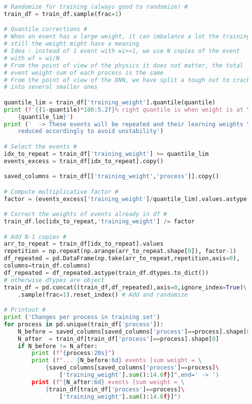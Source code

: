 \begin{lstlisting}[language=Python, caption=DNN setup for the \wwgg semi-leptonic final state, label={dnncode}]
# Randomize for training (always good to randomize) #
train_df = train_df.sample(frac=1)

# Quantile corrections #
# When an event has a large weight, it can imbalance a lot the training,
# still the weight might have a meaning
# Idea : instead of 1 event with wi>>1, we use N copies of the event
# with wf = wi/N
# From the point of view of the physics it does not matter, the total
# event weight sum of each process is the same
# From the point of view of the DNN, we have split a tough nut to crack
# into several smaller ones

quantile_lim = train_df['training_weight'].quantile(quantile)
print (f'{(1-quantile)*100:5.2f}% right quantile is when weight is at \
    {quantile_lim}')
print ('  -> These events will be repeated and their learning weights \
    reduced accordingly to avoid unstability') 

# Select the events #
idx_to_repeat = train_df['training_weight'] >= quantile_lim                          
events_excess = train_df[idx_to_repeat].copy()

saved_columns = train_df[['training_weight','process']].copy()

# Compute multiplicative factor #
factor = (events_excess['training_weight']/quantile_lim).values.astype(np.int32) 

# Correct the weights of events already in df #
train_df.loc[idx_to_repeat,'training_weight'] /= factor

# Add N-1 copies #
arr_to_repeat = train_df[idx_to_repeat].values                                       
repetition = np.repeat(np.arange(arr_to_repeat.shape[0]), factor-1)                   
df_repeated = pd.DataFrame(np.take(arr_to_repeat,repetition,axis=0),
columns=train_df.columns)
df_repeated = df_repeated.astype(train_df.dtypes.to_dict()) 
# otherwise dtypes are object
train_df = pd.concat((train_df,df_repeated),axis=0,ignore_index=True)\
    .sample(frac=1).reset_index() # Add and randomize

# Printout #
print ('Changes per process in training set')
for process in pd.unique(train_df['process']):
    N_before = saved_columns[saved_columns['process']==process].shape[0]
    N_after  = train_df[train_df['process']==process].shape[0]
    if N_before != N_after:
        print (f"{process:20s}")
        print (f"... {N_before:6d} events [sum weight = \
            {saved_columns[saved_columns['process']==process]\
                ['training_weight'].sum():14.6f}]",end=' -> ')
        print (f"{N_after:6d} events [sum weight = \
            {train_df[train_df['process']==process]\
                ['training_weight'].sum():14.6f}]")
    

\end{lstlisting}
